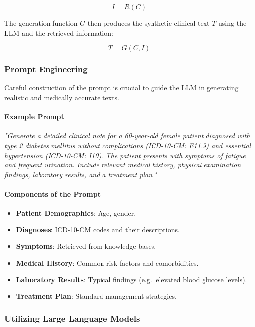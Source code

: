 \documentclass[12pt, a4paper]{article}
\begin{document}
\[
I = R(C)
\]

The generation function \( G \) then produces the synthetic clinical text \( T \) using the LLM and the retrieved information:

\[
T = G(C, I)
\]

\subsubsection{Prompt Engineering}

Careful construction of the prompt is crucial to guide the LLM in generating realistic and medically accurate texts.

\paragraph{Example Prompt}

\textit{"Generate a detailed clinical note for a 60-year-old female patient diagnosed with type 2 diabetes mellitus without complications (ICD-10-CM: E11.9) and essential hypertension (ICD-10-CM: I10). The patient presents with symptoms of fatigue and frequent urination. Include relevant medical history, physical examination findings, laboratory results, and a treatment plan."}

\paragraph{Components of the Prompt}

\begin{itemize}
    \item \textbf{Patient Demographics}: Age, gender.
    \item \textbf{Diagnoses}: ICD-10-CM codes and their descriptions.
    \item \textbf{Symptoms}: Retrieved from knowledge bases.
    \item \textbf{Medical History}: Common risk factors and comorbidities.
    \item \textbf{Laboratory Results}: Typical findings (e.g., elevated blood glucose levels).
    \item \textbf{Treatment Plan}: Standard management strategies.
\end{itemize}

\subsubsection{Utilizing Large Language Models}
\end{document}
